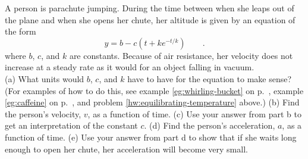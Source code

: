  A person is parachute jumping. During the
time between when she leaps out of the plane and when she
opens her chute, her altitude is given by an equation of the form
\begin{equation*}
      y = b - c\left(t+ke^{-t/k}\right) \qquad .
\end{equation*}
where  $b$, $c$, and
$k$ are constants. Because of air resistance, her velocity
does not increase at a steady rate as it would for an
object falling in vacuum.\\
(a) What units would $b$, $c$, and $k$ have to have for the
equation to make sense? (For examples of how to do this, see
example \ref{eg:whirling-bucket} on p.~\pageref{eg:whirling-bucket},
example \ref{eg:caffeine} on p.~\pageref{eg:caffeine},
and problem \ref{hw:equilibrating-temperature} above.)\hwendpart
(b) Find the person's velocity, $v$, as a function of time.\answercheck\hwendpart
(c) Use your answer from part b to get an interpretation
of the constant $c$.\hwendpart
(d) Find the person's acceleration, $a$, as a function of time.\answercheck\hwendpart
(e) Use your answer from part d to show that if she waits
long enough to open her chute, her acceleration will become very small.
